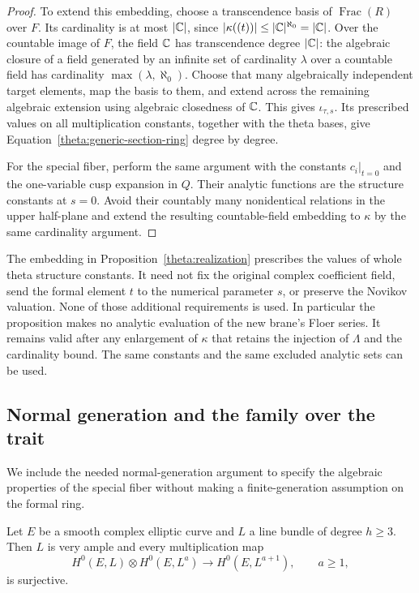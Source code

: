 \begin{proof}
To extend this embedding, choose a transcendence basis of
$\operatorname{Frac}(R)$ over $F$.  Its cardinality is at most
$|\mathbb C|$, since
$|\kappa((t))|\leq|\mathbb C|^{\aleph_0}=|\mathbb C|$.
Over the countable image of $F$, the field $\mathbb C$ has transcendence degree
$|\mathbb C|$: the algebraic closure of a field generated by an infinite set of
cardinality $\lambda$ over a countable field has cardinality
$\max(\lambda,\aleph_0)$.  Choose that many algebraically independent
target elements, map the basis to them, and extend across the remaining
algebraic extension using algebraic closedness of $\mathbb C$.  This gives
$\iota_{\tau,s}$.  Its prescribed values on all multiplication constants,
together with the theta bases, give
Equation~\eqref{theta:generic-section-ring} degree by degree.

For the special fiber, perform the same argument with the constants
$c_i|_{t=0}$ and the one-variable cusp expansion in $Q$.
Their analytic functions are the structure constants at $s=0$.
Avoid their countably many nonidentical relations in the upper half-plane
and extend the resulting countable-field embedding to $\kappa$ by the
same cardinality argument.
\end{proof}

\begin{remark}\label{theta:abstract-embedding}
The embedding in Proposition~\ref{theta:realization} prescribes the values
of whole theta structure constants.  It need not fix the original complex
coefficient field, send the formal element $t$ to the numerical parameter
$s$, or preserve the Novikov valuation.  None of those additional
requirements is used.  In particular the proposition makes no analytic
evaluation of the new brane's Floer series.  It remains valid after any
enlargement of $\kappa$ that retains the injection of $\Lambda$ and the
cardinality bound.  The same constants and the same excluded analytic
sets can be used.
\end{remark}

\subsection{Normal generation and the family over the trait}

We include the needed normal-generation argument to specify the algebraic
properties of the special fiber without making a finite-generation
assumption on the formal ring.

\begin{lemma}\label{theta:elliptic-generation}
Let $E$ be a smooth complex elliptic curve and $L$ a line bundle of degree
$h\geq3$.  Then $L$ is very ample and every multiplication map
\[
 H^0(E,L)\otimes H^0(E,L^a)\longrightarrow H^0(E,L^{a+1}),
 \qquad a\geq1,
\]
is surjective.
\end{lemma}

